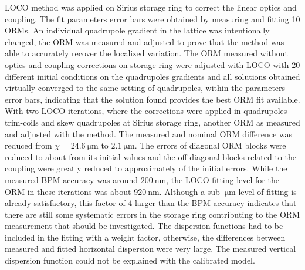     LOCO method was applied on Sirius storage ring to correct the linear optics and coupling. The fit parameters error bars were obtained by measuring and fitting 10 ORMs. An individual quadrupole gradient in the lattice was intentionally changed, the ORM was measured and adjusted to prove that the method was able to accurately recover the localized variation. The ORM measured without optics and coupling corrections on storage ring were adjusted with LOCO with 20 different initial conditions on the quadrupoles gradients and all solutions obtained virtually converged to the same setting of quadrupoles, within the parameters error bars, indicating that the solution found provides the best ORM fit available. With two LOCO iterations, where the corrections were applied in quadrupoles trim-coils and skew quadrupoles at Sirius storage ring, another ORM as measured and adjusted with the method. The measured and nominal ORM difference was reduced from $\chi = \SI{24.6}{\micro\meter}$ to $\SI{2.1}{\micro\meter}$. The errors of diagonal ORM blocks were reduced to about  from its initial values and the off-diagonal blocks related to the coupling were greatly reduced to approximately  of the initial errors. While the measured BPM accuracy was around $\SI{200}{\nano\meter}$, the LOCO fitting level for the ORM in these iterations was about $\SI{920}{\nano\meter}$. Although a sub-$\SI{}{\micro\meter}$ level of fitting is already satisfactory, this factor of 4 larger than the BPM accuracy indicates that there are still some systematic errors in the storage ring contributing to the ORM measurement that should be investigated. The dispersion functions had to be included in the fitting with a weight factor, otherwise, the differences between measured and fitted horizontal dispersion were very large. The measured vertical dispersion function could not be explained with the calibrated model. 
    
